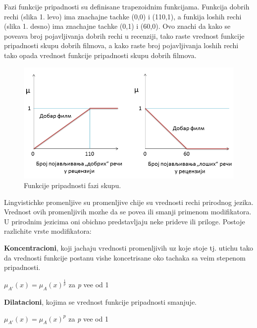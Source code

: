 \documentclass[cyr]{bibl}
\begin{document}
\begin{justify}
Fazi funkcije pripadnosti su definisane trapezoidnim funkcijama. Funkcija dobrih rechi (slika 1. levo) ima znachajne tachke (0,0) i (110,1), a funkija loshih rechi (slika 1. desno) ima znachajne tachke (0,1) i (60,0). Ovo znachi da kako se pove\cc ava broj pojavljivanja dobrih rechi u recenziji, tako raste vrednost funkcije pripadnosti skupu dobrih filmova, a kako raste broj pojavljivanja loshih rechi tako opada vrednost funkcije pripadnosti skupu dobrih filmova. 

\begin{figure}[ht!]
\centering
\includegraphics[width=1.0\textwidth]{fazi2.png}
\caption{Funkcije pripadnosti fazi skupu.}\label{sample image}
\end{figure}


Lingvistichke promenljive su promenljive chije su vrednosti rechi prirodnog jezika. Vrednost ovih promenljivih mozhe da se pove\cc a ili smanji primenom modifikatora. U prirodnim jezicima oni obichno predstavljaju neke prideve ili priloge. Postoje razlichite vrste modifikatora:
\begin{itemize}
    \begin{justify}
    \item \textbf{Koncentracioni}, koji jachaju vrednosti promenljivih uz koje stoje tj. utichu tako da vrednosti funkcije postanu vishe koncetrisane oko tachaka sa ve\cc im stepenom pripadnosti.
    
    \centering\(\mu_{A'}(x) = \mu_{A}(x)^{\frac{1}{p}}\)  za \textit{\Lat p} ve\cc e od 1
    \end{justify}
    \begin{justify}
	\item \textbf{Dilatacioni}, kojima se vrednost funkcije pripadnosti smanjuje.
	
    \centering\(\mu_{A'}(x) = \mu_{A}(x)^{p}\)  za \textit{\Lat p} ve\cc e od 1
    

\end{justify}
\end{itemize}
\end{justify}
\end{document}
